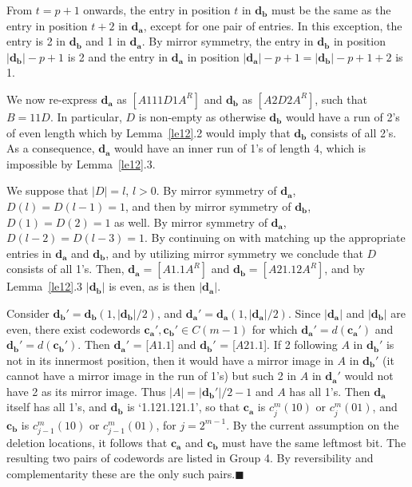 From $t=p+1$ onwards, the entry in position $t$ in $\mathbf{d_b}$
must be the same as the entry in position $t+2$ in $\mathbf{d_a}$,
except for one pair of entries. In this exception, the entry is 2
in $\mathbf{d_b}$ and 1 in $\mathbf{d_a}$. By mirror symmetry, the
entry in $\mathbf{d_b}$ in position $|\mathbf{d_b}|-p+1$ is 2 and
the entry in $\mathbf{d_a}$ in position $|\mathbf{d_a}|-p+1 =
|\mathbf{d_b}|-p+1+2$ is 1.

We now re-express $\mathbf{d_a}$ as $[A111D1A^R]$ and
$\mathbf{d_b}$ as $[A2D2A^R]$, such that $B=11D$. In particular,
$D$ is non-empty as otherwise $\mathbf{d_b}$ would have a run of
2's of even length which by Lemma~\ref{le12}.2 would imply that
$\mathbf{d_b}$ consists of all 2's. As a consequence,
$\mathbf{d_a}$ would have an inner run of 1's of length 4, which
is impossible by Lemma~\ref{le12}.3.

We suppose that $|D|=l$, $l>0$. By mirror symmetry of
$\mathbf{d_a}$, $D(l)=D(l-1)=1$, and then by mirror symmetry of
$\mathbf{d_b}$, $D(1)=D(2)=1$ as well. By mirror symmetry of
$\mathbf{d_a}$, $D(l-2)=D(l-3)=1$. By continuing on with matching
up the appropriate entries in $\mathbf{d_a}$ and $\mathbf{d_b}$,
and by utilizing mirror symmetry we conclude that $D$ consists of
all 1's. Then, $\mathbf{d_a}=[A1.1A^R]$ and
$\mathbf{d_b}=[A21.12A^R]$, and by Lemma~\ref{le12}.3
$|\mathbf{d_b}|$ is even, as is then $|\mathbf{d_a}|$.

Consider $\mathbf{d_b'}=\mathbf{d_b}(1,|\mathbf{d_b}|/2)$, and
$\mathbf{d_a'}=\mathbf{d_a}(1,|\mathbf{d_a}|/2)$. Since
$|\mathbf{d_a}|$ and $|\mathbf{d_b}|$ are even, there exist
codewords $\mathbf{c_a'}, \mathbf{c_b'} \in C(m-1)$ for which
$\mathbf{d_a'}=d(\mathbf{c_a'})$ and
$\mathbf{d_b'}=d(\mathbf{c_b'})$. Then $\mathbf{d_a'}$ = [$A1.1$]
and $\mathbf{d_b'}$ = [$A21.1$]. If 2 following $A$ in
$\mathbf{d_b'}$ is not in its innermost position, then it would
have a mirror image in $A$ in $\mathbf{d_b'}$ (it cannot have a
mirror image in the run of 1's) but such 2 in $A$ in
$\mathbf{d_a'}$ would not have 2 as its mirror image. Thus
$|A|=|\mathbf{d_b'}|/2-1$ and $A$ has all 1's. Then $\mathbf{d_a}$
itself has all 1's, and $\mathbf{d_b}$ is `1.121.121.1', so that
$\mathbf{c_a}$ is $c_j^m(10)$ or $c_j^m(01)$, and $\mathbf{c_b}$
is $c_{j-1}^m(10)$ or $c_{j-1}^m(01)$, for $j=2^{m-1}$. By the
current assumption on the deletion locations, it follows that
$\mathbf{c_a}$ and $\mathbf{c_b}$ must have the same leftmost bit.
The resulting two pairs of codewords are listed in Group 4. By
reversibility and complementarity these are the only such
pairs.\hfill $\blacksquare$

